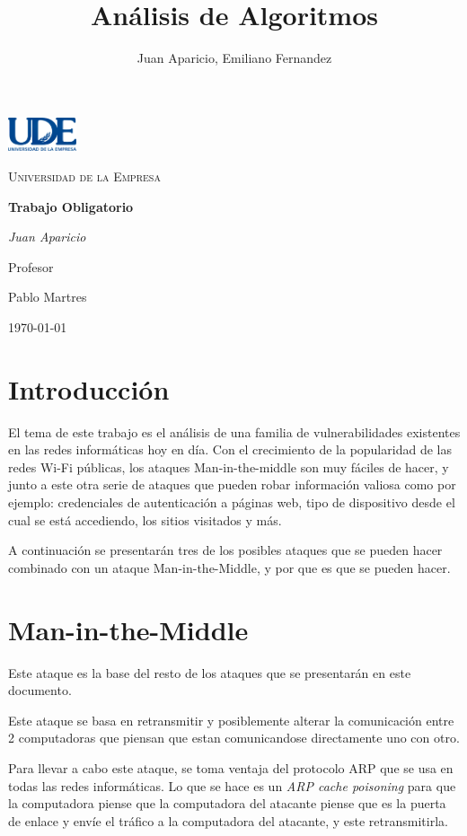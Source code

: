\documentclass[a4paper, 13pt]{article}
\title{Análisis de Algoritmos}
\author{Juan Aparicio, Emiliano Fernandez}
\begin{document}
	\begin{titlepage}
		\centering
		\includegraphics[width=0.15\textwidth]{logo-ude.png}\par\vspace{1cm}
		{\scshape\LARGE Universidad de la Empresa \par}
		\vspace{3cm}
		{\huge\bfseries Trabajo Obligatorio\par}
		\vspace{2cm}
		{\Large\itshape Juan Aparicio\par}
		\vfill
		Profesor \par
		Pablo Martres
		
		\vfill
		
		{\large \today\par}
	\end{titlepage}
	\tableofcontents
	\newpage
	\section{Introducción}
	\par El tema de este trabajo es el análisis de una familia de vulnerabilidades existentes en las redes informáticas hoy en día. Con el crecimiento de la popularidad de las redes Wi-Fi públicas, los ataques Man-in-the-middle son muy fáciles de hacer, y junto a este otra serie de ataques que pueden robar información valiosa como por ejemplo: credenciales de autenticación a páginas web, tipo de dispositivo desde el cual se está accediendo, los sitios visitados y más.
	\par A continuación se presentarán tres de los posibles ataques que se pueden hacer combinado con un ataque Man-in-the-Middle, y por que es que se pueden hacer.
	
	\section{Man-in-the-Middle}
	\par Este ataque es la base del resto de los ataques que se presentarán en este documento.
	\par Este ataque se basa en retransmitir y posiblemente alterar la comunicación entre 2 computadoras que piensan que estan comunicandose directamente uno con otro.
	\par Para llevar a cabo este ataque, se toma ventaja del protocolo ARP que se usa en todas las redes informáticas. Lo que se hace es un \textit{ARP cache poisoning} para que la computadora piense que la computadora del atacante piense que es la puerta de enlace y envíe el tráfico a la computadora del atacante, y este retransmitirla.
	
\end{document}
